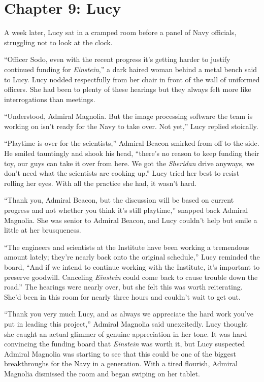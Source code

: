\documentclass[12pt]{article} %
\begin{document}
\newpage
\section{Chapter 9: Lucy}
A week later, Lucy sat in a cramped room before a panel of Navy officials, struggling not to look at the clock.

``Officer Sodo, even with the recent progress it's getting harder to justify continued funding for \textit{Einstein},'' a dark haired woman behind a metal bench said to Lucy. Lucy nodded respectfully from her chair in front of the wall of uniformed officers. She had been to plenty of these hearings but they always felt more like interrogations than meetings.

``Understood, Admiral Magnolia. But the image processing software the team is working on isn't ready for the Navy to take over. Not yet,'' Lucy replied stoically.

``Playtime is over for the scientists,'' Admiral Beacon smirked from off to the side. He smiled tauntingly and shook his head, ``there's no reason to keep funding their toy, our guys can take it over from here. We got the \textit{Sheridan} drive anyways, we don't need what the scientists are cooking up.'' Lucy tried her best to resist rolling her eyes. With all the practice she had, it wasn't hard.

``Thank you, Admiral Beacon, but the discussion will be based on current progress and not whether you think it's still playtime,'' snapped back Admiral Magnolia. She was senior to Admiral Beacon, and Lucy couldn't help but smile a little at her brusqueness.

``The engineers and scientists at the Institute have been working a tremendous amount lately; they're nearly back onto the original schedule,'' Lucy reminded the board, ``And if we intend to continue working with the Institute, it's important to preserve goodwill. Canceling \textit{Einstein} could come back to cause trouble down the road.'' The hearings were nearly over, but she felt this was worth reiterating. She'd been in this room for nearly three hours and couldn't wait to get out.

``Thank you very much Lucy, and as always we appreciate the hard work you've put in leading this project,'' Admiral Magnolia said unexcitedly. Lucy thought she caught an actual glimmer of genuine appreciation in her tone. It was hard convincing the funding board that \textit{Einstein} was worth it, but Lucy suspected Admiral Magnolia was starting to see that this could be one of the biggest breakthroughs for the Navy in a generation. With a tired flourish, Admiral Magnolia dismissed the room and began swiping on her tablet.
\end{document}
